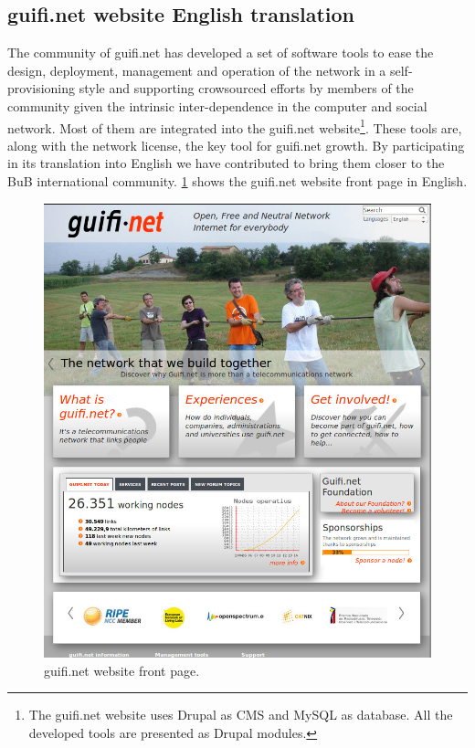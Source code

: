 \subsection{guifi.net website English translation}

The community of guifi.net has developed a set of software tools to ease the design, deployment, management and operation of the network in a self-provisioning style and supporting crowsourced efforts by members of the community given the intrinsic inter-dependence in the computer and social network. Most of them are integrated into the guifi.net website\footnote{The guifi.net website uses Drupal as CMS and MySQL as database. All the developed tools are presented as Drupal modules.}. These tools are, along with the network license, the key tool for guifi.net growth. By participating in its translation into English we have contributed to  bring them closer to the BuB international community. \figurename \ref{fig:guifi_web} shows the guifi.net website front page in English.

\begin{figure}[H]
  \centering
  \includegraphics[width=0.75\linewidth]{sect2/figures/guifi_website_crop.jpg}
  \caption[guifi.net website front page.]{guifi.net website front page.}
  \label{fig:guifi_web}
\end{figure}

